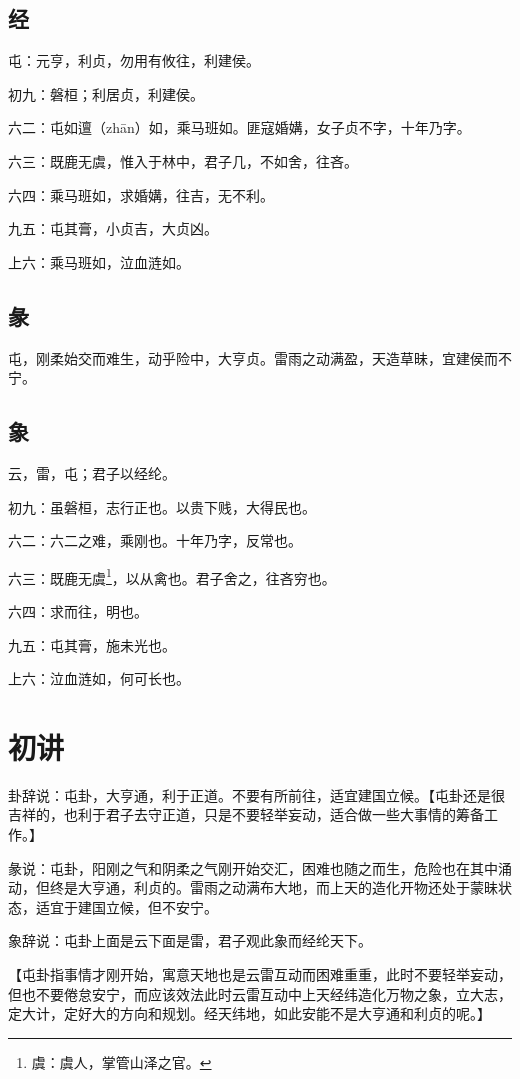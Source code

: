 \documentclass[12pt,oneside]{book}
\begin{document}
\subsection{经}
屯：元亨，利贞，勿用有攸往，利建侯。

初九：磐桓；利居贞，利建侯。

六二：屯如邅（zhān）如，乘马班如。匪寇婚媾，女子贞不字，十年乃字。

六三：既鹿无虞，惟入于林中，君子几，不如舍，往吝。

六四：乘马班如，求婚媾，往吉，无不利。

九五：屯其膏，小贞吉，大贞凶。

上六：乘马班如，泣血涟如。

\subsection{彖}
屯，刚柔始交而难生，动乎险中，大亨贞。雷雨之动满盈，天造草昧，宜建侯而不宁。

\subsection{象}
云，雷，屯；君子以经纶。

初九：虽磐桓，志行正也。以贵下贱，大得民也。

六二：六二之难，乘刚也。十年乃字，反常也。

六三：既鹿无虞\footnote{虞：虞人，掌管山泽之官。}，以从禽也。君子舍之，往吝穷也。

六四：求而往，明也。

九五：屯其膏，施未光也。

上六：泣血涟如，何可长也。

\section{初讲}
卦辞说：屯卦，大亨通，利于正道。不要有所前往，适宜建国立候。【屯卦还是很吉祥的，也利于君子去守正道，只是不要轻举妄动，适合做一些大事情的筹备工作。】

彖说：屯卦，阳刚之气和阴柔之气刚开始交汇，困难也随之而生，危险也在其中涌动，但终是大亨通，利贞的。雷雨之动满布大地，而上天的造化开物还处于蒙昧状态，适宜于建国立候，但不安宁。

象辞说：屯卦上面是云下面是雷，君子观此象而经纶天下。

【屯卦指事情才刚开始，寓意天地也是云雷互动而困难重重，此时不要轻举妄动，但也不要倦怠安宁，而应该效法此时云雷互动中上天经纬造化万物之象，立大志，定大计，定好大的方向和规划。经天纬地，如此安能不是大亨通和利贞的呢。】
\end{document}
